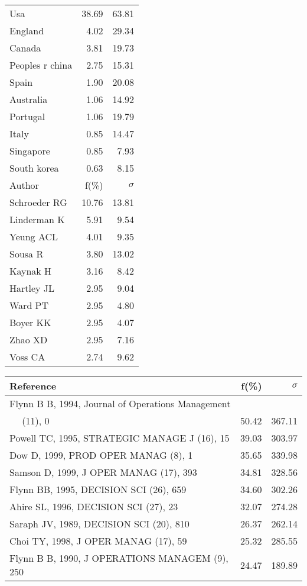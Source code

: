 \documentclass[a4paper,11pt]{report}
\begin{document}
\begin{landscape}
\begin{table}[!ht]
{\begin{tabular}{|l r r|}
\hline
Usa & 38.69 & 63.81\\
England & 4.02 & 29.34\\
Canada & 3.81 & 19.73\\
Peoples r china & 2.75 & 15.31\\
Spain & 1.90 & 20.08\\
Australia & 1.06 & 14.92\\
Portugal & 1.06 & 19.79\\
Italy & 0.85 & 14.47\\
Singapore & 0.85 & 7.93\\
South korea & 0.63 & 8.15\\
\hline
\hline
Author & f(\%) & $\sigma$\\
\hline
Schroeder RG & 10.76 & 13.81\\
Linderman K & 5.91 & 9.54\\
Yeung ACL & 4.01 & 9.35\\
Sousa R & 3.80 & 13.02\\
Kaynak H & 3.16 & 8.42\\
Hartley JL & 2.95 & 9.04\\
Ward PT & 2.95 & 4.80\\
Boyer KK & 2.95 & 4.07\\
Zhao XD & 2.95 & 7.16\\
Voss CA & 2.74 & 9.62\\
\hline
\end{tabular}
}
{\scriptsize\begin{tabular}{|l r r|}
\hline
Reference & f(\%) & $\sigma$\\
\hline
Flynn B B, 1994, Journal of Operations Management &  & \\
$\quad$ (11), 0 & 50.42 & 367.11\\
Powell TC, 1995, STRATEGIC MANAGE J (16), 15 & 39.03 & 303.97\\
Dow D, 1999, PROD OPER MANAG (8), 1 & 35.65 & 339.98\\
Samson D, 1999, J OPER MANAG (17), 393 & 34.81 & 328.56\\
Flynn BB, 1995, DECISION SCI (26), 659 & 34.60 & 302.26\\
Ahire SL, 1996, DECISION SCI (27), 23 & 32.07 & 274.28\\
Saraph JV, 1989, DECISION SCI (20), 810 & 26.37 & 262.14\\
Choi TY, 1998, J OPER MANAG (17), 59 & 25.32 & 285.55\\
Flynn B B, 1990, J OPERATIONS MANAGEM (9), 250 & 24.47 & 189.89\\

\end{tabular}}
\end{table}
\end{landscape}
\end{document}
